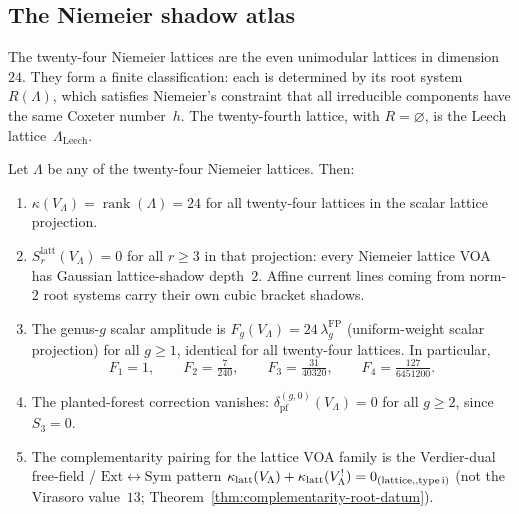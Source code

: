 \subsection{The Niemeier shadow atlas}%
\label{subsec:lattice:niemeier-atlas}%
%

The twenty-four Niemeier lattices are the even unimodular lattices
in dimension~$24$. They form a finite classification: each is
determined by its root system~$R(\Lambda)$, which satisfies
Niemeier's constraint that all irreducible components have the
same Coxeter number~$h$. The twenty-fourth lattice, with
$R = \varnothing$, is the Leech lattice~$\Lambda_{\mathrm{Leech}}$.

\begin{theorem}%
\label{thm:lattice:niemeier-shadow-universality}%
%
%
Let $\Lambda$ be any of the twenty-four Niemeier lattices. Then:
\begin{enumerate}[label=\textup{(\roman*)}]
\item $\kappa(V_\Lambda) = \operatorname{rank}(\Lambda) = 24$
for all twenty-four lattices in the scalar lattice projection.
\item $S_r^{\mathrm{latt}}(V_\Lambda) = 0$ for all $r \geq 3$ in
that projection: every Niemeier lattice VOA has Gaussian
lattice-shadow depth~$2$.
Affine current lines coming from norm-$2$ root systems carry their own
cubic bracket shadows.
\item The genus-$g$ scalar amplitude is
$F_g(V_\Lambda) = 24\,\lambda_g^{\mathrm{FP}}$
\textup{(}uniform-weight scalar projection\textup{}) for all $g \geq 1$,
identical for all twenty-four lattices. In particular,
\begin{equation}\label{eq:niemeier-genus-amplitudes}
F_1 = 1,\qquad
F_2 = \tfrac{7}{240},\qquad
F_3 = \tfrac{31}{40320},\qquad
F_4 = \tfrac{127}{6451200}.
\end{equation}
\item The planted-forest correction vanishes:
$\delta_{\mathrm{pf}}^{(g,0)}(V_\Lambda) = 0$ for all $g \geq 2$,
since $S_3 = 0$.
\item The complementarity pairing for the lattice VOA family is
the Verdier-dual free-field / $\mathrm{Ext}\leftrightarrow\mathrm{Sym}$ pattern
$\kappa_{\mathrm{latt}}(V_\Lambda) + \kappa_{\mathrm{latt}}(V_\Lambda^!) = 0_{\text{(lattice,\\,type\,i)}}$
\textup{(}not the Virasoro value~$13$;
	Theorem~\textup{\ref{thm:complementarity-root-datum}}\textup{)}.
\end{enumerate}
\end{theorem}

